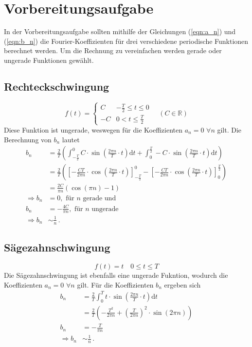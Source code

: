 \section{Vorbereitungsaufgabe}
\label{sec:Vorbereitungsaufgabe}
In der Vorbereitungsaufgabe sollten mithilfe der Gleichungen (\ref{eqn:a_n}) und (\ref{eqn:b_n}) die Fourier-Koeffizienten 
für drei verschiedene periodische Funktionen berechnet werden. Um die Rechnung zu vereinfachen werden gerade oder ungerade Funktionen gewählt.
\subsection{Rechteckschwingung}
\begin{equation*}
    f(t) = \begin{cases}
        C & -\frac{T}{2} \leq t \leq 0\\
        -C & 0 < t \leq \frac{T}{2}
    \end{cases}
    \quad (C \in \mathbb{R})
\end{equation*}
Diese Funktion ist ungerade, weswegen für die Koeffizienten $a_n=0\,\,\forall n$ gilt. Die Berechnung von $b_n$ lautet
\begin{align*}
    b_n &= \frac{2}{T}\left( \int _{-\frac{T}{2}}^{0} C \cdot \sin \left(\frac{2\pi n}{T}\cdot t\right)\text{d}t + \int_{0}^{\frac{T}{2}}-C \cdot \sin \left(\frac{2\pi  n}{T}\cdot t\right)\text{d}t\right)\\
    &= \frac{2}{T}\left( \left[-\frac{CT}{2 \pi n}\cdot \cos \left(\frac{2\pi n}{T}\cdot t\right)\right]_{-\frac{T}{2}}^{0} - \left[-\frac{CT}{2 \pi n}\cdot \cos \left(\frac{2\pi n}{T}\cdot t\right)\right]_{0}^{\frac{T}{2}}\right)\\
    &= \frac{2C}{\pi n} \left(\cos\left(\pi n\right) - 1 \right)\\
    \Rightarrow b_n &= 0,\text{ für } n\text{ gerade und}\\
     b_n &= -\frac{4C}{\pi n},\text{ für } n\text{ ungerade}\\
    \Rightarrow b_n &\sim \frac{1}{n}\,.
\end{align*}
\subsection{Sägezahnschwingung}
\begin{equation*}
    f(t) = t\quad 0 \leq t \leq T
\end{equation*}
Die Sägezahnschwingung ist ebenfalls eine ungerade Fukntion, wodurch die Koeffizienten $a_n = 0 \,\,\forall n $ gilt. 
Für die Koeffizienten $b_n$ ergeben sich
\begin{align*}
    b_n &= \frac{2}{T} \int_{0}^{T} t \cdot \sin \left(\frac{2 \pi n}{T}\cdot t\right) \text{d}t\\
    &= \frac{2}{T} \left(-\frac{T^2}{2 \pi n} + \left(\frac{T}{2 \pi n}\right)^2 \cdot\sin \left(2 \pi n\right)\right)\\
    b_n&= - \frac{T}{\pi n}\\
    \Rightarrow b_n &\sim \frac{1}{n}\,.
\end{align*}
